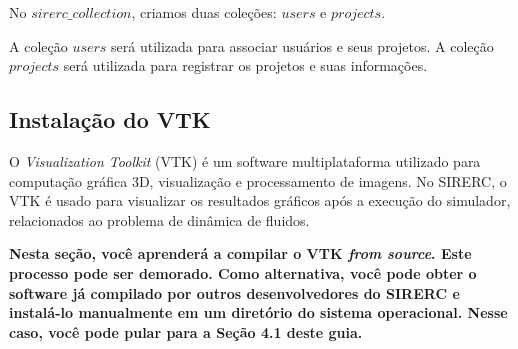 \documentclass[a4paper,11pt]{article}
\newcommand{\sistema}{\textsf{SIRERC}}
\newcommand{\cautionbox}[1]{
	\vskip 5mm
	\begin{leftbar}
		\textbf{#1}
	\end{leftbar}
	\vskip 5mm
}
\begin{document}
No $sirerc\_collection$, criamos duas coleções: $users$ e $projects$.

A coleção $users$ será utilizada para associar usuários e seus projetos. A coleção $projects$ será utilizada para registrar os projetos e suas informações. 








\subsection{Instalação do VTK}

O \emph{Visualization Toolkit} (VTK) é um software multiplataforma utilizado para computação gráfica 3D, visualização e processamento de imagens. No \sistema{}, o VTK é usado para visualizar os resultados gráficos após a execução do simulador, relacionados ao problema de dinâmica de fluidos.

\cautionbox{
	Nesta seção, você aprenderá a compilar o VTK \emph{from source}. Este processo pode ser demorado. Como alternativa, você pode obter o software já compilado por outros desenvolvedores do \sistema{} e instalá-lo manualmente em um diretório do sistema operacional. Nesse caso, você pode pular para a Seção 4.1 deste guia.
}
\end{document}
